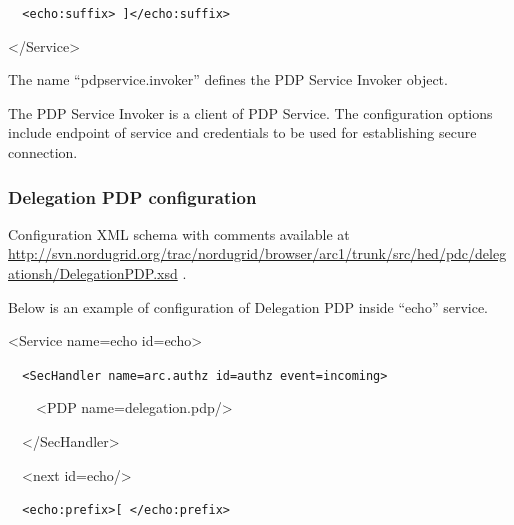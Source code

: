 \documentclass{article}
\begin{document}
{\upshape\color{black}
\foreignlanguage{spanish}{\texttt{\ \ }}\texttt{{\textless}echo:suffix{\textgreater}
]{\textless}/echo:suffix{\textgreater}}}

{\ttfamily\color{black}
{\textless}/Service{\textgreater}}

{\upshape\color{black}
The name {\textquotedblleft}pdpservice.invoker{\textquotedblright}
defines the PDP Service Invoker object.}

{\color{black}
The PDP Service Invoker is a client of PDP Service. The configuration
options include endpoint of service and credentials to be used for
establishing secure connection.}


\bigskip

\subsubsection{Delegation PDP configuration}
{\upshape\color{black}
Configuration XML schema with comments available at
\url{http://svn.nordugrid.org/trac/nordugrid/browser/arc1/trunk/src/hed/pdc/delegationsh/DelegationPDP.xsd}
.}

{\upshape\color{black}
Below is an example of configuration of Delegation PDP inside
{\textquotedblleft}echo{\textquotedblright} service.}

{\ttfamily\color{black}
{\textless}Service name={\textquotedbl}echo{\textquotedbl}
id={\textquotedbl}echo{\textquotedbl}{\textgreater}}

{\upshape\color{black}
\foreignlanguage{spanish}{\texttt{\ \ }}\texttt{{\textless}SecHandler
name={\textquotedbl}arc.authz{\textquotedbl}
id={\textquotedbl}authz{\textquotedbl}
event={\textquotedbl}incoming{\textquotedbl}{\textgreater}}}

{\ttfamily\color{black}
\ \ \ \ {\textless}PDP
name={\textquotedbl}delegation.pdp{\textquotedbl}/{\textgreater}}

{\ttfamily\color{black}
\ \ {\textless}/SecHandler{\textgreater}}

{\ttfamily\color{black}
\ \ {\textless}next
id={\textquotedbl}echo{\textquotedbl}/{\textgreater}}

{\upshape\color{black}
\texttt{\ \ }\foreignlanguage{spanish}{\texttt{{\textless}echo:prefix{\textgreater}[
{\textless}/echo:prefix{\textgreater}}}}
\end{document}
